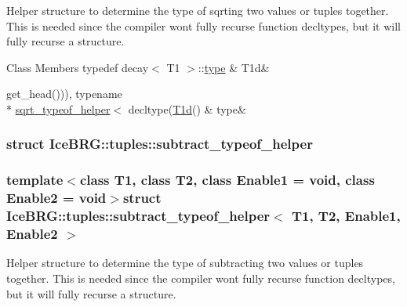 Helper structure to determine the type of sqrting two values or tuples together. This is needed since the compiler won\textquotesingle{}t fully recurse function decltypes, but it will fully recurse a structure. \begin{DoxyFields}{Class Members}
\hypertarget{namespaceIceBRG_1_1tuples_a72b5de2684a13e04d40d8c4d99c449a5}{}typedef decay$<$ T1 $>$\+::\hyperlink{namespaceIceBRG_1_1tuples_a0a6b119c6ecb453a52b9c4e9a7dc9942}{type}\label{namespaceIceBRG_1_1tuples_a72b5de2684a13e04d40d8c4d99c449a5}
&
T1d&
\\
\hline

\hypertarget{namespaceIceBRG_1_1tuples_a0a6b119c6ecb453a52b9c4e9a7dc9942}{}get\+\_\+head())), typename \\*
\hyperlink{namespaceIceBRG_1_1tuples_structIceBRG_1_1tuples_1_1sqrt__typeof__helper}{sqrt\+\_\+typeof\+\_\+helper}$<$ decltype(\hyperlink{namespaceIceBRG_1_1tuples_a72b5de2684a13e04d40d8c4d99c449a5}{T1d}()\label{namespaceIceBRG_1_1tuples_a0a6b119c6ecb453a52b9c4e9a7dc9942}
&
type&
\\
\hline

\end{DoxyFields}
\label{structIceBRG_1_1tuples_1_1subtract__typeof__helper}
\hypertarget{namespaceIceBRG_1_1tuples_structIceBRG_1_1tuples_1_1subtract__typeof__helper}{}
\subsubsection{struct Ice\+B\+R\+G\+:\+:tuples\+:\+:subtract\+\_\+typeof\+\_\+helper}
\subsubsection*{template$<$class T1, class T2, class Enable1 = void, class Enable2 = void$>$struct Ice\+B\+R\+G\+::tuples\+::subtract\+\_\+typeof\+\_\+helper$<$ T1, T2, Enable1, Enable2 $>$}

Helper structure to determine the type of subtracting two values or tuples together. This is needed since the compiler won\textquotesingle{}t fully recurse function decltypes, but it will fully recurse a structure. \label{structIceBRG_1_1tuples_1_1subtract__typeof__helper_3_01boost_1_1tuples_1_1null__type_00_01boost_80010c4fbaf3d761a5da3d020e0023b6}
\hypertarget{namespaceIceBRG_1_1tuples_structIceBRG_1_1tuples_1_1subtract__typeof__helper_3_01boost_1_1tuples_1_1null__type_00_01boost_80010c4fbaf3d761a5da3d020e0023b6}{}
